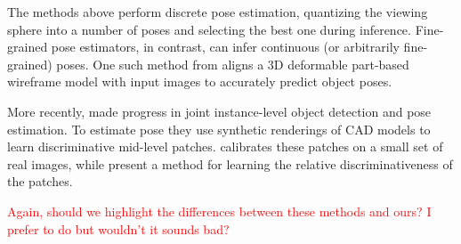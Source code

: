\documentclass[10pt,twocolumn,letterpaper]{article}
\begin{document}
The methods above perform discrete pose estimation, quantizing the viewing
sphere into a number of poses and selecting the best one during inference.
Fine-grained pose estimators, in contrast, can infer continuous (or arbitrarily
fine-grained) poses. One such method from \cite{Zia13} aligns a 3D deformable
part-based wireframe model with input images to accurately predict object poses.

More recently, \cite{Aubry14, Lim14} made progress in joint instance-level
object detection and pose estimation. To estimate pose they use synthetic
renderings of CAD models to learn discriminative mid-level patches.
\cite{Aubry14} calibrates these patches on a small set of real images, while
\cite{Lim14} present a method for learning the relative discriminativeness of
the patches.

\textcolor{red}{Again, should we highlight the differences between these methods and ours? I prefer to do but wouldn't it sounds bad?}

  
\end{document}
